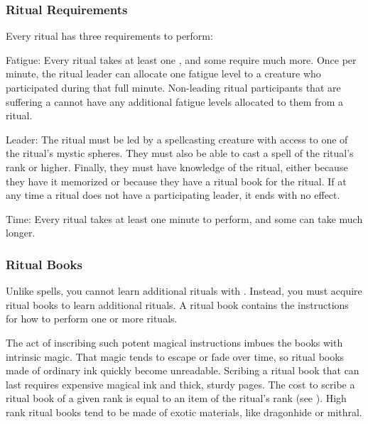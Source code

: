     \subsubsection{Ritual Requirements}\label{Ritual Requirements}
      Every ritual has three requirements to perform:
      \begin{raggeditemize}
        \item Fatigue: Every ritual takes at least one , and some require much more.
          Once per minute, the ritual leader can allocate one fatigue level to a creature who participated during that full minute.
          Non-leading ritual participants that are suffering a  cannot have any additional fatigue levels allocated to them from a ritual.
        \item Leader: The ritual must be led by a spellcasting creature with access to one of the ritual's mystic spheres.
          They must also be able to cast a spell of the ritual's rank or higher.
          Finally, they must have knowledge of the ritual, either because they have it memorized or because they have a ritual book for the ritual.
          If at any time a ritual does not have a participating leader, it ends with no effect.
        \item Time: Every ritual takes at least one minute to perform, and some can take much longer.
      \end{raggeditemize}

    \subsubsection{Ritual Books}\label{Ritual Books}
      Unlike spells, you cannot learn additional rituals with .
      Instead, you must acquire ritual books to learn additional rituals.
      A ritual book contains the instructions for how to perform one or more rituals.

      The act of inscribing such potent magical instructions imbues the books with intrinsic magic.
      That magic tends to escape or fade over time, so ritual books made of ordinary ink quickly become unreadable.
      Scribing a ritual book that can last requires expensive magical ink and thick, sturdy pages.
      The cost to scribe a ritual book of a given rank is equal to an item of the ritual's rank (see ).
      High rank ritual books tend to be made of exotic materials, like dragonhide or mithral.

